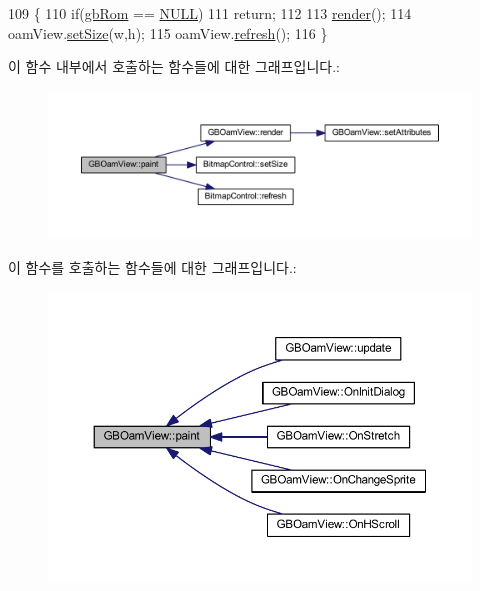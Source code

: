 \begin{DoxyCode}
109 \{
110   \textcolor{keywordflow}{if}(\mbox{\hyperlink{gb_globals_8cpp_ae4f6bd8162474dbcfdbc54c36d7f5695}{gbRom}} == \mbox{\hyperlink{getopt1_8c_a070d2ce7b6bb7e5c05602aa8c308d0c4}{NULL}})
111     \textcolor{keywordflow}{return};
112   
113   \mbox{\hyperlink{class_g_b_oam_view_a6862114f9b3873d08f7ae8bd465c2eda}{render}}();
114   oamView.\mbox{\hyperlink{class_bitmap_control_a421004fe6ba01329dd69259396592d1f}{setSize}}(w,h);
115   oamView.\mbox{\hyperlink{class_bitmap_control_acf061a1e9a4cad90ad2827c14f79caa2}{refresh}}();
116 \}
\end{DoxyCode}
이 함수 내부에서 호출하는 함수들에 대한 그래프입니다.\+:
\nopagebreak
\begin{figure}[H]
\begin{center}
\leavevmode
\includegraphics[width=350pt]{class_g_b_oam_view_a8ed062f5cac9239a17b0f5942a5d9e5b_cgraph}
\end{center}
\end{figure}
이 함수를 호출하는 함수들에 대한 그래프입니다.\+:
\nopagebreak
\begin{figure}[H]
\begin{center}
\leavevmode
\includegraphics[width=350pt]{class_g_b_oam_view_a8ed062f5cac9239a17b0f5942a5d9e5b_icgraph}
\end{center}
\end{figure}
\mbox{\label{class_g_b_oam_view_ac9b79cd9099423b88668870db35a739a}} 
